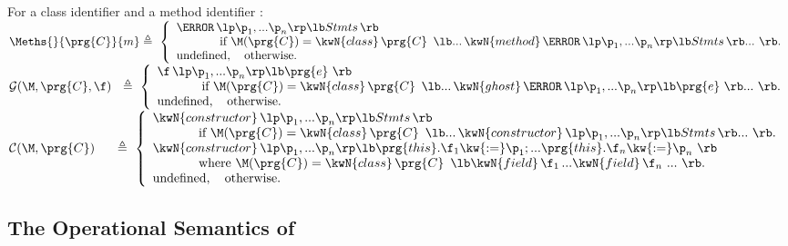  \begin{definition}[Lookup] For a class identifier   and a method identifier $:$  $ ~ $ \\
\label{def:lookup}
\noindent
$
\Meths {} {\prg{C}} {m}       \triangleq  \ \left\{
\begin{array}{l}
                        \m\, \lp \p_1, ... \p_n \rp \lb Stmts\, \rb\\
\hspace{0.5in} \mbox{if}\  \M(\prg{C}) =   \kwN{class}\, \prg{C}\, \  \lb ...\,   \kwN{method}\, \m\, \lp \p_1, ... \p_n \rp \lb Stmts\,  \rb  ... \ \rb.
\\
\mbox{undefined},  \ \ \ \mbox{otherwise.}
\end{array}
                    \right.$
\\
$
{\mathcal G} (\M, {\prg{C}}, {\f})    \ \   \triangleq  \ \left\{
\begin{array}{l}
                        \f\, \lp \p_1, ... \p_n \rp \lb \prg{e}\  \rb\\
\hspace{0.5in} \mbox{if}\  \M(\prg{C}) =   \kwN{class}\, \prg{C}\, \  \lb ...\,   \kwN{ghost}\,  \m\, \lp \p_1, ... \p_n \rp \lb \prg{e} \  \rb  ... \ \rb.
\\
\mbox{undefined},  \ \ \ \mbox{otherwise.}
\end{array}
                    \right.$
\\
$
{\mathcal C} (\M, {\prg{C}})   \quad \ \,   \triangleq  \ \left\{
\begin{array}{l}
                        \kwN{constructor} \, \lp \p_1, ... \p_n \rp \lb Stmts\, \rb\\
\hspace{0.5in} \mbox{if}\  \M(\prg{C}) =   \kwN{class}\, \prg{C}\, \  \lb ... \, \kwN{constructor} \, \lp \p_1, ... \p_n \rp \lb Stmts\, \rb ... \ \rb.
\\
\kwN{constructor} \, \lp \p_1, ... \p_n \rp \lb \prg{this}.\f_1 \kw{:=} \p_1; ... \prg{this}.\f_n \kw{:=} \p_n\ \rb\\
\hspace{0.5in} \mbox{where}\  \M(\prg{C}) =   \kwN{class}\, \prg{C}\, \  \lb \kwN{field}\, \f_1\, ... \kwN{field}\, \f_n\ ... \ \rb.
\\
\mbox{undefined},  \ \ \ \mbox{otherwise.}
\end{array}
                    \right.$
  \end{definition}

\subsection{The Operational Semantics of \LangOO}
\label{formal:semantics}

